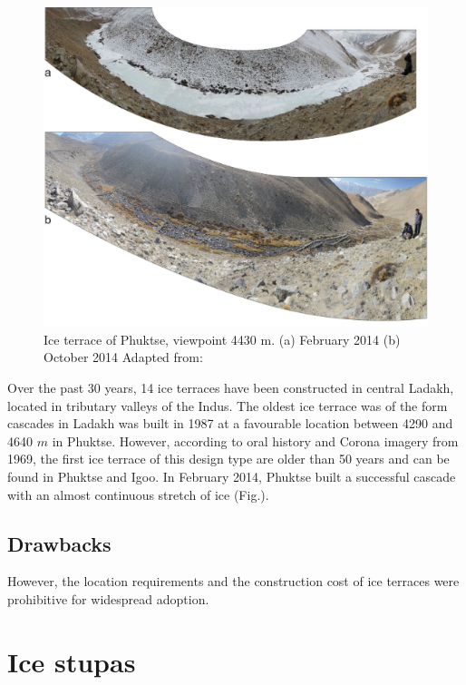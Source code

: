 \begin{figure}[t]
\centering
\includegraphics[width=12cm]{Figures/IT_example.png}

\caption{Ice terrace of Phuktse, viewpoint 4430 m. (a) February 2014 (b) October 2014 Adapted from: \cite{nusserSociohydrologyArtificialGlaciers2019}}

\label{fig:ITexample}
\end{figure}

Over the past 30 years, 14 ice terraces have been constructed in central Ladakh, located in tributary valleys of
the Indus. The oldest ice terrace was of the form cascades in Ladakh was built in 1987 at a favourable location
between 4290 and 4640 $m$ in Phuktse. However, according to oral history and Corona imagery from 1969, the first ice
terrace of this design type are older than 50 years and can be found in Phuktse and Igoo. In February 2014,
Phuktse built a successful cascade with an almost continuous stretch of ice (Fig.).


\subsection{Drawbacks}

However, the location requirements and the construction cost of ice terraces were prohibitive for widespread
adoption. 


\section{Ice stupas}

